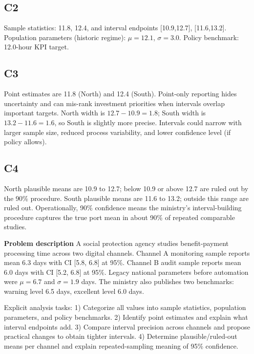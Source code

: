 \begin{ExamProblems}
		\subsection*{C2}
		Sample statistics: 11.8, 12.4, and interval endpoints [10.9,12.7], [11.6,13.2].
		Population parameters (historic regime): $\mu=12.1$, $\sigma=3.0$.
		Policy benchmark: 12.0-hour KPI target.
		
		\subsection*{C3}
		Point estimates are 11.8 (North) and 12.4 (South).
		Point-only reporting hides uncertainty and can mis-rank investment priorities when intervals overlap important targets.
		North width is $12.7-10.9=1.8$; South width is $13.2-11.6=1.6$, so South is slightly more precise.
		Intervals could narrow with larger sample size, reduced process variability, and lower confidence level (if policy allows).
		
		\subsection*{C4}
		North plausible means are 10.9 to 12.7; below 10.9 or above 12.7 are ruled out by the 90\% procedure.
		South plausible means are 11.6 to 13.2; outside this range are ruled out.
		Operationally, 90\% confidence means the ministry's interval-building procedure captures the true port mean in about 90\% of repeated comparable studies.

		\newpage
		\item
		\textbf{Problem description}
		A social protection agency studies benefit-payment processing time across two digital channels.
		Channel A monitoring sample reports mean 6.3 days with CI [5.8, 6.8] at 95\%.
		Channel B audit sample reports mean 6.0 days with CI [5.2, 6.8] at 95\%.
		Legacy national parameters before automation were $\mu=6.7$ and $\sigma=1.9$ days.
		The ministry also publishes two benchmarks: warning level 6.5 days, excellent level 6.0 days.
		
		Explicit analysis tasks:
		1) Categorize all values into sample statistics, population parameters, and policy benchmarks.
		2) Identify point estimates and explain what interval endpoints add.
		3) Compare interval precision across channels and propose practical changes to obtain tighter intervals.
		4) Determine plausible/ruled-out means per channel and explain repeated-sampling meaning of 95\% confidence.
		

\end{ExamProblems}
